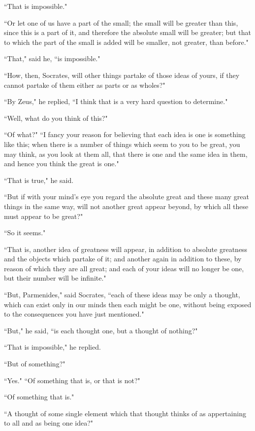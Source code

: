 \documentclass[letterpaper,12pt]{article}
\newcommand{\stephpag}[1]{\marginnote{\small\itshape\fontfamily{ppl}\selectfont #1}}
\begin{document}
``That is impossible."

``Or let one of us have a part of the small; the small will be greater than this, since this is a part of it, and therefore the absolute small will be greater; but that to which the part of the small is added will be smaller, \stephpag{e} not greater, than before."

``That," said he, ``is impossible."

``How, then, Socrates, will other things partake of those ideas of yours, if they cannot partake of them either as parts or as wholes?"

``By Zeus," he replied, ``I think that is a very hard question to determine."

``Well, what do you think of this?"

``Of what?" \stephpag{132 a} ``I fancy your reason for believing that each idea is one is something like this; when there is a number of things which seem to you to be great, you may think, as you look at them all, that there is one and the same idea in them, and hence you think the great is one."

``That is true," he said.

``But if with your mind's eye you regard the absolute great and these many great things in the same way, will not another great appear beyond, by which all these must appear to be great?"

``So it seems."

``That is, another idea of greatness will appear, in addition to absolute greatness and the objects which partake of it; \stephpag{b} and another again in addition to these, by reason of which they are all great; and each of your ideas will no longer be one, but their number will be infinite."

``But, Parmenides," said Socrates, ``each of these ideas may be only a thought, which can exist only in our minds then each might be one, without being exposed to the consequences you have just mentioned."

``But," he said, ``is each thought one, but a thought of nothing?"

``That is impossible," he replied.

``But of something?"

``Yes." \stephpag{c} ``Of something that is, or that is not?"

``Of something that is."

``A thought of some single element which that thought thinks of as appertaining to all and as being one idea?"
\end{document}
